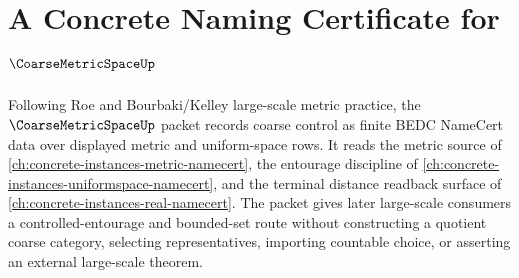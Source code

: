 \chapter{A Concrete Naming Certificate for $\CoarseMetricSpaceUp$}
\label{ch:concrete-instances-coarse-metric-space-namecert}

Following Roe and Bourbaki/Kelley large-scale metric practice, the $\CoarseMetricSpaceUp$ packet records coarse control as finite BEDC NameCert data over displayed metric and uniform-space rows. It reads the metric source of \autoref{ch:concrete-instances-metric-namecert}, the entourage discipline of \autoref{ch:concrete-instances-uniformspace-namecert}, and the terminal distance readback surface of \autoref{ch:concrete-instances-real-namecert}. The packet gives later large-scale consumers a controlled-entourage and bounded-set route without constructing a quotient coarse category, selecting representatives, importing countable choice, or asserting an external large-scale theorem.

